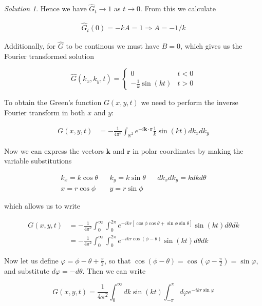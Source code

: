 \documentclass[12pt,a4paper]{article}
\theoremstyle{definition}
\theoremstyle{remark}
\newtheorem*{solution}{Solution}
\begin{document}
\begin{enumerate}[(a)]
\begin{solution}
         Hence we have $\hat G_t \rightarrow 1$ as $t \rightarrow 0$. From this we calculate 

         \begin{align*}
            \hat G_t(0) = -k A = 1 \Rightarrow A = -1/k
         \end{align*}

         Additionally, for $\hat G$ to be continous we must have $B=0$, which gives us the Fourier transformed solution 

         $$\hat G(k_x, k_y, t) = \begin{cases}
            0 & t<0 \\ 
            -\frac{1}{k} \sin(kt) & t>0
         \end{cases}$$

         To obtain the Green's function $G(x,y,t)$ we need to perform the inverse Fourier transform in both $x$ and $y$:

         \begin{align*}
            G(x,y,t) &= -\frac{1}{4\pi^2} \int_{\mathbb R^2} e^{-i\mathbf k \cdot \mathbf r} \frac{1}{k} \sin(kt) dk_x dk_y
         \end{align*}

         Now we can express the vectors $\mathbf k$ and $\mathbf r$ in polar coordinates by making the variable substitutions 

         \begin{align*}
            k_x = k \cos \theta &&k_y = k \sin \theta && dk_x dk_y = k dk d\theta \\
            x = r \cos \phi && y = r\sin \phi
         \end{align*}
         
         which allows us to write 
         
         \begin{align*}
            G(x,y,t) &= -\frac{1}{4\pi^2}\int_{0}^\infty \int_{0}^{2\pi}  e^{-i kr[\cos \phi \cos \theta + \sin \phi \sin \theta]} \sin(kt) d\theta dk \\
            &= -\frac{1}{4\pi^2}\int_{0}^\infty \int_{0}^{2\pi}  e^{-i kr \cos(\phi-\theta)} \sin(kt) d\theta dk
         \end{align*}

         Now let us define $\varphi = \phi-\theta + \frac{\pi}{2}$, so that $\cos(\phi - \theta) = \cos(\varphi - \frac{\pi}{2}) = \sin\varphi$, and substitute $d \varphi = -d\theta$. Then we can write 

         $$G(x,y,t) = \frac{1}{4 \pi^2} \int_0^\infty dk \sin(kt)\int_{-\pi}^{\pi}d\varphi e^{-ikr \sin \varphi}$$


\end{solution}
\end{enumerate}
\end{document}
